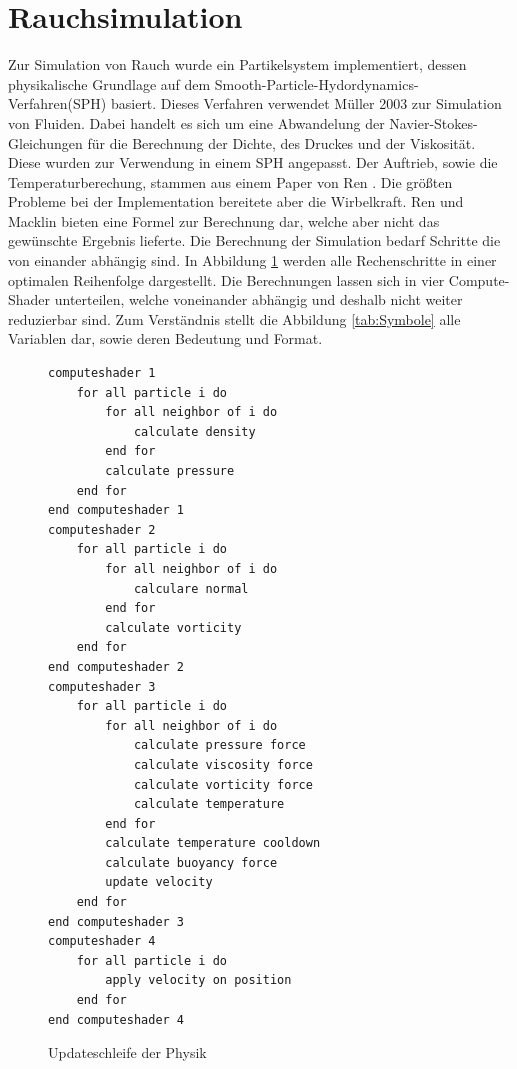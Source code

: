 \documentclass[intern,palatino]{cgBA}
\begin{document}

\section{Rauchsimulation}\label{rauch}

Zur Simulation von Rauch wurde ein Partikelsystem implementiert, dessen physikalische Grundlage auf dem Smooth-Particle-Hydordynamics-Verfahren(SPH) basiert. Dieses Verfahren verwendet Müller \cite{muller2003particle} 2003 zur Simulation von Fluiden. Dabei handelt es sich um eine Abwandelung der Navier-Stokes-Gleichungen für die Berechnung der Dichte, des Druckes und der Viskosität. Diese wurden zur Verwendung in einem SPH angepasst. Der Auftrieb, sowie die Temperaturberechung, stammen aus einem Paper von Ren \cite{ren2016fast}. Die größten Probleme bei der Implementation bereitete aber die Wirbelkraft. Ren und Macklin \cite{macklin2014unified} bieten eine Formel zur Berechnung dar, welche aber nicht das gewünschte Ergebnis lieferte.
\newline
Die Berechnung der Simulation bedarf Schritte die von einander abhängig sind. In Abbildung \ref{code:sim} werden alle Rechenschritte in einer optimalen Reihenfolge dargestellt. Die Berechnungen lassen sich in vier Compute-Shader unterteilen, welche voneinander abhängig und deshalb nicht weiter reduzierbar sind.
\newline
Zum Verständnis stellt die Abbildung \ref{tab:Symbole} alle Variablen dar, sowie deren Bedeutung und Format.

\begin{figure} [H]
	\centering
	\begin{lstlisting}
computeshader 1	
	for all particle i do
		for all neighbor of i do
			calculate density
		end for
		calculate pressure
	end for
end computeshader 1
computeshader 2
	for all particle i do
		for all neighbor of i do
			calculare normal
		end for
		calculate vorticity
	end for
end computeshader 2
computeshader 3
	for all particle i do
		for all neighbor of i do
			calculate pressure force
			calculate viscosity force
			calculate vorticity force
			calculate temperature
		end for
		calculate temperature cooldown
		calculate buoyancy force
		update velocity
	end for
end computeshader 3
computeshader 4
	for all particle i do
		apply velocity on position
	end for
end computeshader 4
	\end{lstlisting}
	\caption{Updateschleife der Physik}
	\label{code:sim}
\end{figure}
\end{document}
